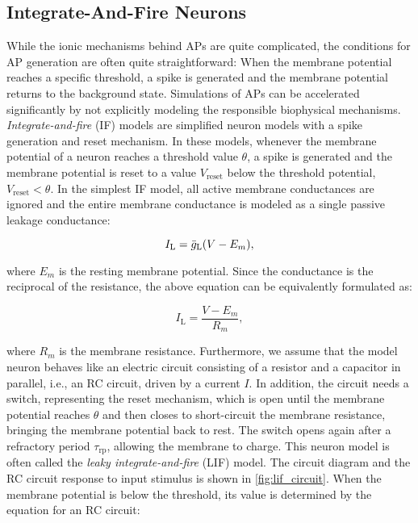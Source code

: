 \subsection{Integrate-And-Fire Neurons}

While the ionic mechanisms behind APs are quite complicated, the conditions for AP generation are often quite straightforward: When the membrane potential reaches a specific threshold, a spike is generated and the membrane potential returns to the background state. Simulations of APs can be accelerated significantly by not explicitly modeling the responsible biophysical mechanisms. \textit{Integrate-and-fire} (IF) models are simplified neuron models with a spike generation and reset mechanism. In these models, whenever the membrane potential of a neuron reaches a threshold value $\theta$, a spike is generated and the membrane potential is reset to a value $V_\mathrm{reset}$ below the threshold potential, $V_\mathrm{reset} < \theta$. In the simplest IF model, all active membrane conductances are ignored and the entire membrane conductance is modeled as a single passive leakage conductance: 

\begin{equation*}
    I_\mathrm{L} = \bar{g}_\mathrm{L} \qty(V - E_m),
\end{equation*}

where $E_m$ is the resting membrane potential. Since the conductance is the reciprocal of the resistance, the above equation can be equivalently formulated as: 

\begin{equation*}
    I_\mathrm{L} = \frac{V - E_m}{R_m},
\end{equation*}

where $R_m$ is the membrane resistance. Furthermore, we assume that the model neuron behaves like an electric circuit consisting of a resistor and a capacitor in parallel, i.e., an RC circuit, driven by a current $I$. In addition, the circuit needs a switch, representing the reset mechanism, which is open until the membrane potential reaches $\theta$ and then closes to short-circuit the membrane resistance, bringing the membrane potential back to rest. The switch opens again after a refractory period $\tau_\mathrm{rp}$, allowing the membrane to charge. This neuron model is often called the \textit{leaky integrate-and-fire} (LIF) model. The circuit diagram and the RC circuit response to input stimulus is shown in \autoref{fig:lif_circuit}. When the membrane potential is below the threshold, its value is determined by the equation for an RC circuit: 

